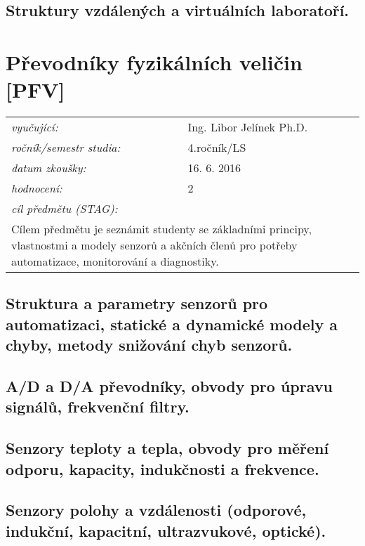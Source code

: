 \subsection{Struktury vzdálených a virtuálních laboratoří.}

\newpage
\section{Převodníky fyzikálních veličin [PFV]}

\begin{table}[H]
\centering
\begin{tabular}{p{4cm} p{12cm}}
\textit{vyučující:}             & Ing. Libor Jelínek Ph.D. \\
\textit{ročník/semestr studia:} & 4.ročník/LS \\
\textit{datum zkoušky:}         & 16. 6. 2016 \\
\textit{hodnocení:}             & 2 \\
\textit{cíl předmětu (STAG):}   & \\
\multicolumn{2}{p{16cm}}{Cílem předmětu je seznámit studenty se základními principy, vlastnostmi a modely senzorů a akčních členů pro potřeby automatizace, monitorování a diagnostiky.}
\end{tabular}
\end{table}

\subsection{Struktura a parametry senzorů pro automatizaci, statické a dynamické modely a chyby, metody snižování chyb senzorů.}

\subsection{A/D a D/A převodníky, obvody pro úpravu signálů, frekvenční filtry.}

\subsection{Senzory teploty a tepla, obvody pro měření odporu, kapacity, indukčnosti a frekvence.}

\subsection{Senzory polohy a vzdálenosti (odporové, indukční, kapacitní, ultrazvukové, optické).}

